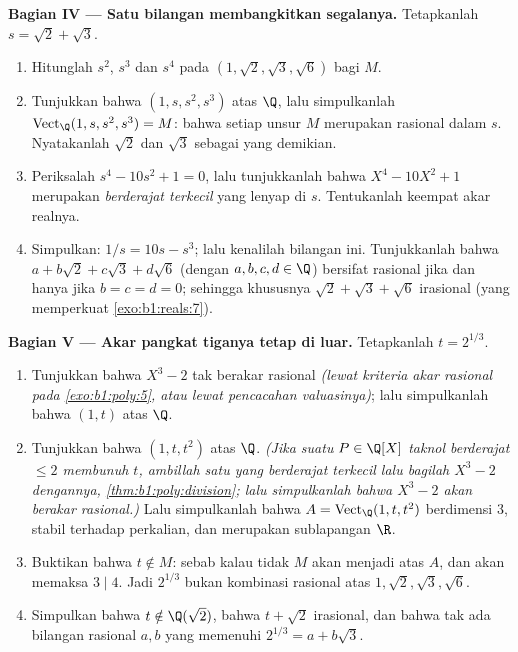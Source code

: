\begin{problem}
\medskip
\noindent\textbf{Bagian IV --- Satu bilangan membangkitkan segalanya.}
Tetapkanlah $s = \sqrt2 + \sqrt3$.
\begin{enumerate}[resume]
  \item Hitunglah  $s^2$, $s^3$ dan $s^4$ pada
         $(1, \sqrt2, \sqrt3, \sqrt6)$ bagi $M$.
  \item Tunjukkan bahwa $(1, s, s^2, s^3)$  atas $\Q$, lalu simpulkanlah
        $\operatorname{Vect}_\Q(1, s, s^2, s^3) = M$: bahwa setiap
        unsur $M$ merupakan  rasional dalam $s$. Nyatakanlah
        $\sqrt2$ dan $\sqrt3$ sebagai  yang demikian.
  \item Periksalah $s^4 - 10s^2 + 1 = 0$, lalu tunjukkanlah bahwa $X^4 - 10X^2
        + 1$ merupakan \emph{ berderajat terkecil}
        yang lenyap di $s$. Tentukanlah keempat akar realnya.
  \item Simpulkan: $1/s = 10s - s^3$; lalu kenalilah bilangan ini. Tunjukkanlah
        bahwa $a + b\sqrt2 + c\sqrt3 + d\sqrt6$ (dengan $a,b,c,d \in \Q$)
        bersifat rasional jika dan hanya jika $b = c = d = 0$; sehingga
        khususnya $\sqrt2 + \sqrt3 + \sqrt6$ irasional
        (yang memperkuat \cref{exo:b1:reals:7}).
\end{enumerate}

\medskip
\noindent\textbf{Bagian V --- Akar pangkat tiganya tetap di luar.} Tetapkanlah $t
= 2^{1/3}$.
\begin{enumerate}[resume]
  \item Tunjukkan bahwa $X^3 - 2$ tak berakar rasional \emph{(lewat
        kriteria akar rasional pada \cref{exo:b1:poly:5}, atau lewat
        pencacahan valuasinya)}; lalu simpulkanlah bahwa $(1, t)$  atas
        $\Q$.
  \item Tunjukkan bahwa $(1, t, t^2)$  atas $\Q$. \emph{(Jika suatu
        $P \in \Q[X]$ taknol berderajat $\leq 2$ membunuh $t$, ambillah
        satu yang berderajat terkecil lalu bagilah $X^3 - 2$ dengannya,
        \cref{thm:b1:poly:division}; lalu simpulkanlah bahwa $X^3 - 2$
        akan berakar rasional.)} Lalu simpulkanlah bahwa $A =
        \operatorname{Vect}_\Q(1, t, t^2)$ berdimensi $3$,
        stabil terhadap perkalian, dan merupakan sublapangan $\R$.
  \item Buktikan bahwa $t \notin M$: sebab kalau tidak $M$ akan menjadi  atas  $A$, dan  akan memaksa
        $3 \mid 4$. Jadi $2^{1/3}$ bukan kombinasi rasional
        atas $1, \sqrt2, \sqrt3, \sqrt6$.
  \item Simpulkan bahwa $t \notin \Q(\sqrt2)$, bahwa $t + \sqrt2$
        irasional, dan bahwa tak ada bilangan rasional $a, b$ yang memenuhi
        $2^{1/3} = a + b\sqrt3$.
\end{enumerate}


\end{problem}
